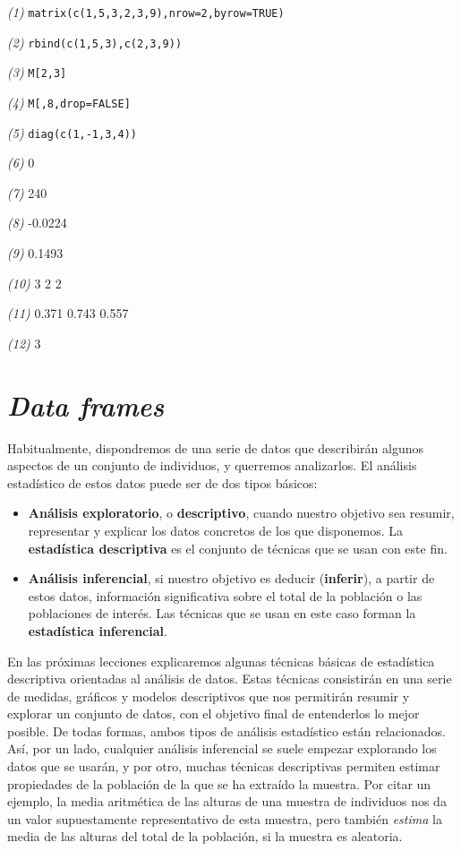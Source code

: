 \documentclass[
]{book}
\theoremstyle{definition}
\theoremstyle{definition}
\theoremstyle{definition}
\theoremstyle{remark}
\begin{document}
\emph{(1)} \texttt{matrix(c(1,5,3,2,3,9),nrow=2,byrow=TRUE)}

\emph{(2)} \texttt{rbind(c(1,5,3),c(2,3,9))}

\emph{(3)} \texttt{M{[}2,3{]}}

\emph{(4)} \texttt{M{[},8,drop=FALSE{]}}

\emph{(5)} \texttt{diag(c(1,-1,3,4))}

\emph{(6)} 0

\emph{(7)} 240

\emph{(8)} -0.0224

\emph{(9)} 0.1493

\emph{(10)} 3 2 2

\emph{(11)} 0.371 0.743 0.557

\emph{(12)} 3

\hypertarget{chap:df}{%
\chapter{\texorpdfstring{\emph{Data frames}}{Data frames}}\label{chap:df}}

Habitualmente, dispondremos de una serie de datos que describirán algunos
aspectos de un conjunto de individuos, y querremos analizarlos. El análisis estadístico de estos datos puede ser de dos tipos básicos:

\begin{itemize}
\item
  \textbf{Análisis exploratorio}, o \textbf{descriptivo}, cuando nuestro objetivo sea resumir, representar y explicar los datos concretos de los que disponemos. La \textbf{estadística descriptiva} es el conjunto de técnicas que se usan con este fin.
\item
  \textbf{Análisis inferencial}, si nuestro objetivo es deducir (\textbf{inferir}), a partir de estos datos,
  información significativa sobre el total de la población o las poblaciones de interés. Las técnicas que se usan en este caso forman la \textbf{estadística inferencial}.
\end{itemize}

En las próximas lecciones explicaremos algunas técnicas básicas de estadística descriptiva orientadas al análisis de datos. Estas técnicas consistirán en una serie de medidas, gráficos y modelos descriptivos que nos permitirán resumir y explorar un conjunto de datos, con el objetivo final de entenderlos lo mejor posible. De todas formas, ambos tipos de análisis estadístico están relacionados. Así, por un lado, cualquier análisis inferencial se suele empezar explorando los datos que se usarán, y por otro, muchas técnicas descriptivas permiten estimar propiedades de la población de la que se ha extraído la muestra. Por citar un ejemplo, la media aritmética de las alturas de una muestra de individuos nos da un valor supuestamente representativo de esta muestra, pero también \emph{estima} la media de las alturas del total de la población, si la muestra es aleatoria.
\end{document}
